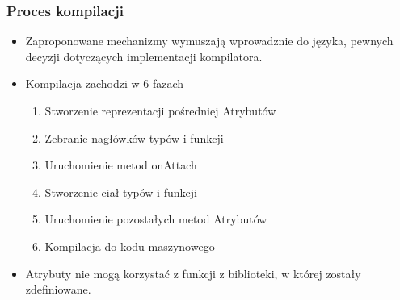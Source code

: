 \begin{frame}
	\frametitle{Proces kompilacji}

	\begin{itemize}
		\item Zaproponowane mechanizmy wymuszają wprowadznie do języka, pewnych decyzji dotyczących implementacji kompilatora.
		\item Kompilacja zachodzi w 6 fazach\begin{enumerate}
			\item Stworzenie reprezentacji pośredniej Atrybutów
			\item Zebranie nagłówków typów i funkcji
			\item Uruchomienie metod onAttach
			\item Stworzenie ciał typów i funkcji
			\item Uruchomienie pozostałych metod Atrybutów
			\item Kompilacja do kodu maszynowego
		\end{enumerate}
		\item Atrybuty nie mogą korzystać z funkcji z biblioteki, w której zostały zdefiniowane.
	\end{itemize}

\end{frame}


